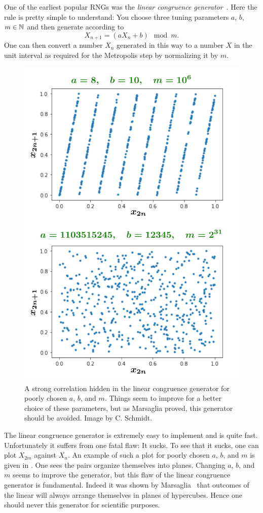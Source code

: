 One of the earliest popular RNGs was the {\it linear congruence
generator}~\cite{lehmer_mathematical_1951,thomson_modified_1958}. 
Here the rule is pretty simple
to understand: You choose three tuning parameters $a$, $b$, $m\in\mathbb{N}$
and then generate according to
\begin{equation}\label{eq:linearCongruence}
X_{n+1}=(aX_n+b)\mod m.
\end{equation}
One can then convert a number $X_n$ generated in this way to a number $X$
in the unit interval as required for the Metropolis step by normalizing it by $m$.


\begin{figure}
\centering
\includegraphics[width=0.6\linewidth]{figs/linear_congruence.pdf}
\caption{A strong correlation hidden in the linear congruence generator for
poorly chosen $a$, $b$, and $m$. Things seem to improve for a better choice of
these parameters, but as Marsaglia proved, this generator should be avoided. 
Image by C. Schmidt.}
\label{fig:LCG}
\end{figure}

The linear congruence generator is extremely easy to implement and is quite
fast. Unfortunately it suffers from one fatal flaw: It sucks. To see that it
sucks, one can plot $X_{2m}$ against $X_n$. An example of such a plot for
poorly chosen $a$, $b$, and $m$ is given in . One sees the
pairs organize themselves into planes. Changing $a$, $b$, and $m$ seems
to improve the generator, but this flaw of the linear congruence generator
is fundamental. Indeed it was shown by Marsaglia~\cite{marsaglia_random_1968} that
outcomes of the linear will always arrange themselves in planes of hypercubes.
Hence one should never this generator for scientific purposes.

